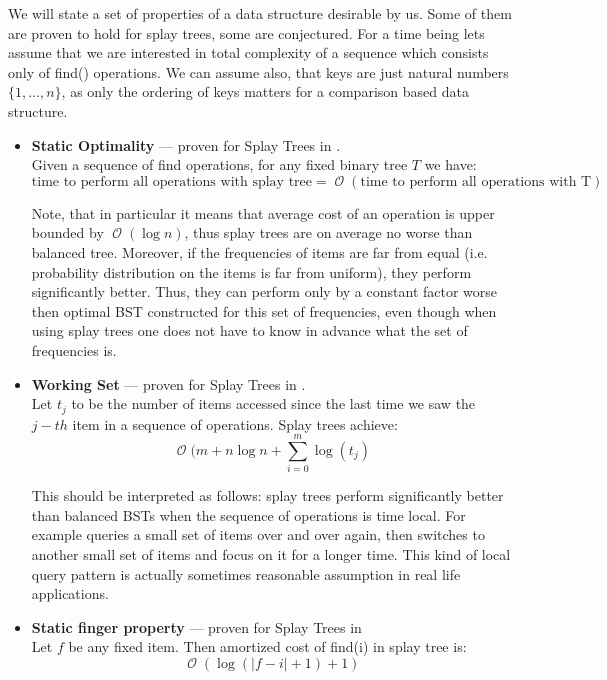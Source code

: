 \documentclass[11pt]{article}
\DeclareMathOperator*{\Oh}{\mathcal{O}}
\begin{document}
We will state a set of properties of a data structure desirable by us. Some of them are proven to hold for splay trees, some are conjectured. For a time being lets assume that we are interested in total complexity of a sequence which consists only of find() operations. We can assume also, that keys are just natural numbers $\{1, \ldots, n\}$, as only the ordering of keys matters for a comparison based data structure.
\begin{itemize}
	\item {\bf Static Optimality} --- proven for Splay Trees in \cite{DBLP:journals/jacm/SleatorT85}. \\
		Given a sequence of find operations, for any fixed binary tree $T$ we have:
		\begin{equation*}
			\text{time to perform all operations with splay tree} = \Oh(\text{time to perform all operations with T})
		\end{equation*}

		Note, that in particular it means that average cost of an operation is upper bounded by $\Oh(\log n)$, thus splay trees are on average no worse than balanced tree. Moreover, if the frequencies of items are far from equal (i.e. probability distribution on the items is far from uniform), they perform significantly better. Thus, they can perform only by a constant factor worse then optimal BST constructed for this set of frequencies, even though when using splay trees one does not have to know in advance what the set of frequencies is.
	\item {\bf Working Set} --- proven for Splay Trees in \cite{DBLP:journals/jacm/SleatorT85}. \\
		Let $t_j$ to be the number of items accessed since the last time we saw the $j-th$ item in a sequence of operations. Splay trees achieve:
		\begin{equation*}
			\Oh(m + n \log n + \sum_{i=0}^m \log(t_j)
		\end{equation*}

		This should be interpreted as follows: splay trees perform significantly better than balanced BSTs  when the sequence of operations is time local. For example queries a small set of items over and over again, then switches to another small set of items and focus on it for a longer time. This kind of local query pattern is actually sometimes reasonable assumption in real life applications.
	\item {\bf Static finger property} --- proven for Splay Trees in \cite{DBLP:journals/jacm/SleatorT85} \\
		Let $f$ be any fixed item. Then amortized cost of find(i) in splay tree is:
		\begin{equation*}
			\Oh(\log(|f - i| + 1) + 1)
		\end{equation*}


\end{itemize}
\end{document}
